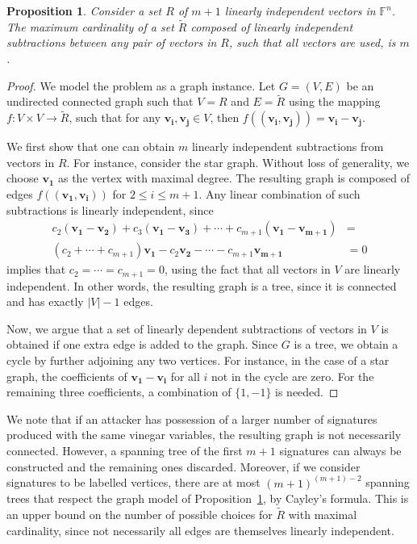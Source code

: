 \documentclass[english]{ufsc-thesis-rn46-2019/ufsc-thesis-rn46-2019}
\newtheorem{proposition}[theorem]{Proposition}
\theoremstyle{definition}
\begin{document}
\begin{proposition}\label{prop:graph}
  Consider a set $R$ of $m + 1$ linearly independent vectors in
  $\mathbb{F}^{n}$. The maximum cardinality of a set $\widetilde{R}$ composed
  of linearly independent subtractions between any pair of vectors in $R$,
  such that all vectors are used, is $m$.
\end{proposition}
\begin{proof}
  We model the problem as a graph instance. Let $G = (V, E)$ be an undirected
  connected graph such that $V = R$ and $E = \widetilde{R}$ using the mapping
  $f : V \times V \to \widetilde{R}$, such that for any
  $\mathbf{v_{i}}, \mathbf{v_{j}} \in V$, then
  $f((\mathbf{v_{i}}, \mathbf{v_{j}})) = \mathbf{v_{i}} - \mathbf{v_{j}}$.

  We first show that one can obtain $m$ linearly independent subtractions from
  vectors in $R$. For instance, consider the star graph. Without loss of
  generality, we choose $\mathbf{v_{1}}$ as the vertex with maximal degree. The
  resulting graph is composed of edges $f((\mathbf{v_{1}}, \mathbf{v_{i}}))$
  for $2 \leq i \leq m + 1$. Any linear combination of such subtractions is
  linearly independent, since
  \begin{align*}
    c_{2} (\mathbf{v_{1}} - \mathbf{v_{2}})
      + c_{3} (\mathbf{v_{1}} - \mathbf{v_{3}}) + \cdots
      + c_{m + 1} (\mathbf{v_{1}} - \mathbf{v_{m + 1}}) &= \\
    (c_{2} + \cdots + c_{m + 1})
      \mathbf{v_{1}} - c_{2} \mathbf{v_{2}} - \cdots
      - c_{m + 1} \mathbf{v_{m + 1}} &= 0
  \end{align*}
  implies that $c_{2} = \cdots = c_{m + 1} = 0$, using the fact that all
  vectors in $V$ are linearly independent. In other words, the resulting
  graph is a tree, since it is connected and has exactly $|V| - 1$ edges.

  Now, we argue that a set of linearly dependent subtractions of vectors in $V$
  is obtained if one extra edge is added to the graph. Since $G$ is a tree, we
  obtain a cycle by further adjoining any two vertices. For instance, in the
  case of a star graph, the coefficients of $\mathbf{v_{1}} - \mathbf{v_{i}}$
  for all $i$ not in the cycle are zero. For the remaining three coefficients,
  a combination of $\{1, -1\}$ is needed.
\end{proof}

We note that if an attacker has possession of a larger number of signatures
produced with the same vinegar variables, the resulting graph is not
necessarily connected. However, a spanning tree of the first $m + 1$ signatures
can always be constructed and the remaining ones discarded. Moreover, if we
consider signatures to be labelled vertices, there are at most
${(m + 1)}^{(m + 1) - 2}$ spanning trees that respect the graph model of
Proposition~\ref{prop:graph}, by Cayley's formula. This is an upper bound on
the number of possible choices for $\widetilde{R}$ with maximal cardinality,
since not necessarily all edges are themselves linearly independent.
\end{document}
